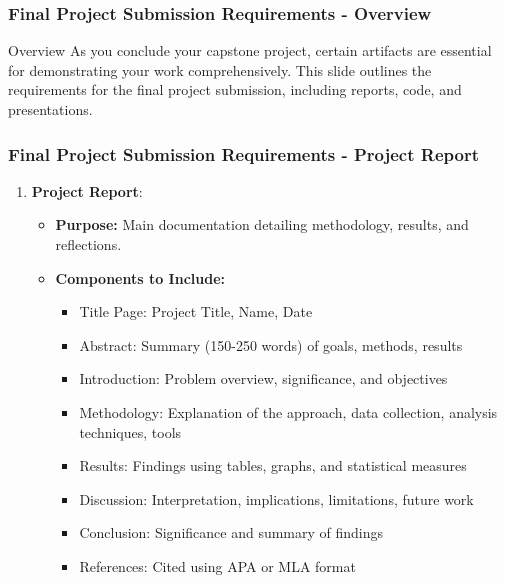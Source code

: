 \documentclass[aspectratio=169]{beamer}
\begin{document}
\begin{frame}[fragile]
    \frametitle{Final Project Submission Requirements - Overview}
    \begin{block}{Overview}
        As you conclude your capstone project, certain artifacts are essential for demonstrating your work comprehensively. This slide outlines the requirements for the final project submission, including reports, code, and presentations.
    \end{block}
\end{frame}

\begin{frame}[fragile]
    \frametitle{Final Project Submission Requirements - Project Report}
    \begin{enumerate}
        \item \textbf{Project Report}:
        \begin{itemize}
            \item \textbf{Purpose:} Main documentation detailing methodology, results, and reflections.
            \item \textbf{Components to Include:}
            \begin{itemize}
                \item Title Page: Project Title, Name, Date
                \item Abstract: Summary (150-250 words) of goals, methods, results
                \item Introduction: Problem overview, significance, and objectives
                \item Methodology: Explanation of the approach, data collection, analysis techniques, tools
                \item Results: Findings using tables, graphs, and statistical measures
                \item Discussion: Interpretation, implications, limitations, future work
                \item Conclusion: Significance and summary of findings
                \item References: Cited using APA or MLA format
            \end{itemize}
        \end{itemize}
    \end{enumerate}
\end{frame}
\end{document}
